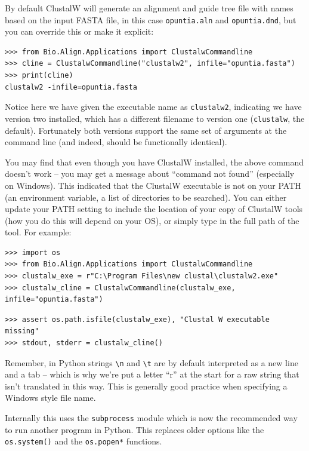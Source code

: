 \documentclass{report}
\begin{document}
By default ClustalW will generate an alignment and guide tree file with names
based on the input FASTA file, in this case \texttt{opuntia.aln} and
\texttt{opuntia.dnd}, but you can override this or make it explicit:

\begin{verbatim}
>>> from Bio.Align.Applications import ClustalwCommandline
>>> cline = ClustalwCommandline("clustalw2", infile="opuntia.fasta")
>>> print(cline)
clustalw2 -infile=opuntia.fasta
\end{verbatim}

Notice here we have given the executable name as \texttt{clustalw2},
indicating we have version two installed, which has a different filename to
version one (\texttt{clustalw}, the default). Fortunately both versions
support the same set of arguments at the command line (and indeed, should be
functionally identical).

You may find that even though you have ClustalW installed, the above command
doesn't work -- you may get a message about ``command not found'' (especially
on Windows). This indicated that the ClustalW executable is not on your PATH
(an environment variable, a list of directories to be searched). You can
either update your PATH setting to include the location of your copy of
ClustalW tools (how you do this will depend on your OS), or simply type in
the full path of the tool. For example:

\begin{verbatim}
>>> import os
>>> from Bio.Align.Applications import ClustalwCommandline
>>> clustalw_exe = r"C:\Program Files\new clustal\clustalw2.exe"
>>> clustalw_cline = ClustalwCommandline(clustalw_exe, infile="opuntia.fasta")
\end{verbatim}
\begin{verbatim}
>>> assert os.path.isfile(clustalw_exe), "Clustal W executable missing"
>>> stdout, stderr = clustalw_cline()
\end{verbatim}

\noindent Remember, in Python strings \verb|\n| and \verb|\t| are by default
interpreted as a new line and a tab -- which is why we're put a letter
``r'' at the start for a raw string that isn't translated in this way.
This is generally good practice when specifying a Windows style file name.

Internally this uses the
\verb|subprocess| module which is now the recommended way to run another
program in Python. This replaces older options like the \verb|os.system()|
and the \verb|os.popen*| functions.
\end{document}
